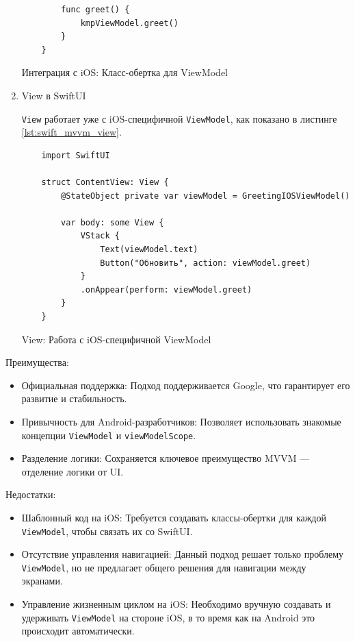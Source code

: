 \documentclass[14pt, russian]{scrartcl}
\begin{document}
\begin{enumerate}
\begin{listing}[H]
\begin{verbatim}
        func greet() {
            kmpViewModel.greet()
        }
    }
    \end{verbatim}
    \caption{Интеграция с iOS: Класс-обертка для ViewModel}
    \label{lst:swift_mvvm_integration}
    \end{listing}

    \item View в SwiftUI

    \texttt{View} работает уже с iOS-специфичной \texttt{ViewModel}, как показано в листинге \ref{lst:swift_mvvm_view}.

    \begin{listing}[H]
    \begin{verbatim}
    import SwiftUI

    struct ContentView: View {
        @StateObject private var viewModel = GreetingIOSViewModel()

        var body: some View {
            VStack {
                Text(viewModel.text)
                Button("Обновить", action: viewModel.greet)
            }
            .onAppear(perform: viewModel.greet)
        }
    }
    \end{verbatim}
    \caption{View: Работа с iOS-специфичной ViewModel}
    \label{lst:swift_mvvm_view}
    \end{listing}
\end{enumerate}

Преимущества:
\begin{itemize}
    \item Официальная поддержка: Подход поддерживается Google, что гарантирует его развитие и стабильность.
    \item Привычность для Android-разработчиков: Позволяет использовать знакомые концепции \texttt{ViewModel} и \texttt{viewModelScope}.
    \item Разделение логики: Сохраняется ключевое преимущество MVVM — отделение логики от UI.
\end{itemize}

Недостатки:
\begin{itemize}
    \item Шаблонный код на iOS: Требуется создавать классы-обертки для каждой \texttt{ViewModel}, чтобы связать их со SwiftUI.
    \item Отсутствие управления навигацией: Данный подход решает только проблему \texttt{ViewModel}, но не предлагает общего решения для навигации между экранами.
    \item Управление жизненным циклом на iOS: Необходимо вручную создавать и удерживать \texttt{ViewModel} на стороне iOS, в то время как на Android это происходит автоматически.
\end{itemize}
\end{document}
